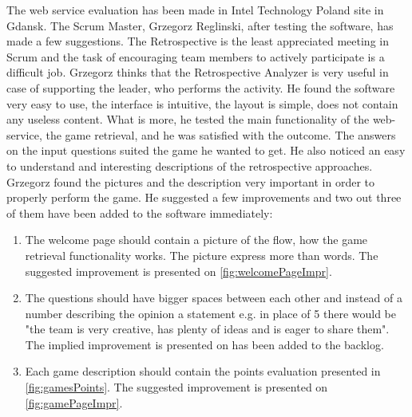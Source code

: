 The web service evaluation has been made in Intel Technology Poland site in Gdansk. The Scrum Master, Grzegorz Reglinski, after testing the software, has made a few suggestions. The Retrospective is the least appreciated meeting in Scrum and the task of encouraging team members to actively participate is a difficult job. Grzegorz thinks that the Retrospective Analyzer is very useful in case of supporting the leader, who performs the activity. He found the software very easy to use, the interface is intuitive, the layout is simple, does not contain any useless content. What is more, he tested the main functionality of the web-service, the game retrieval, and he was satisfied with the outcome. The answers on the input questions suited the game he wanted to get. He also noticed an easy to understand and interesting descriptions of the retrospective approaches. Grzegorz found the pictures and the description very important in order to properly perform the game. He suggested a few improvements and two out three of them have been added to the software immediately: 
\begin{enumerate}
    \item The welcome page should contain a picture of the flow, how the game retrieval functionality works. The picture express more than words. The suggested improvement is presented on \autoref{fig:welcomePageImpr}.
    \item The questions should have bigger spaces between each other and instead of a number describing the opinion a statement e.g. in place of 5 there would be "the team is very creative, has plenty of ideas and is eager to share them". The implied improvement is presented on has been added to the backlog.
    \item Each game description should contain the points evaluation presented in \autoref{fig:gamesPoints}. The suggested improvement is presented on \autoref{fig:gamePageImpr}.
\end{enumerate}

